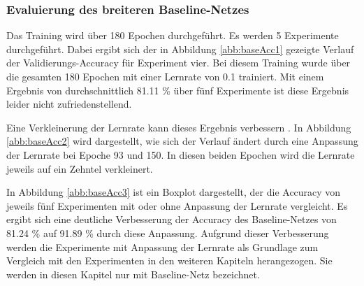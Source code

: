 \subsubsection{Evaluierung des breiteren Baseline-Netzes}
\color{vermi}
Das Training wird über 180 Epochen durchgeführt. Es werden 5 Experimente durchgeführt. Dabei ergibt sich der in Abbildung \ref{abb:baseAcc1} gezeigte Verlauf der Validierungs-Accuracy für Experiment vier. Bei diesem Training wurde über die gesamten 180 Epochen mit einer Lernrate von 0.1 trainiert. Mit einem Ergebnis von durchschnittlich 81.11 \% über fünf Experimente ist diese Ergebnis leider nicht zufriedenstellend. 

Eine Verkleinerung der Lernrate kann dieses Ergebnis verbessern \cite{CNNBook}. In Abbildung \ref{abb:baseAcc2} wird dargestellt, wie sich der Verlauf ändert durch eine Anpassung der Lernrate bei Epoche 93 und 150. In diesen beiden Epochen wird die Lernrate jeweils auf ein Zehntel verkleinert. 

In Abbildung \ref{abb:baseAcc3} ist ein Boxplot dargestellt, der die Accuracy von jeweils fünf Experimenten mit oder ohne Anpassung der Lernrate vergleicht. Es ergibt sich eine deutliche Verbesserung der Accuracy des Baseline-Netzes von 81.24 \% auf 91.89 \% durch diese Anpassung. Aufgrund dieser Verbesserung werden die Experimente mit Anpassung der Lernrate als Grundlage zum Vergleich mit den Experimenten in den weiteren Kapiteln herangezogen. Sie werden in diesen Kapitel nur mit Baseline-Netz bezeichnet.

